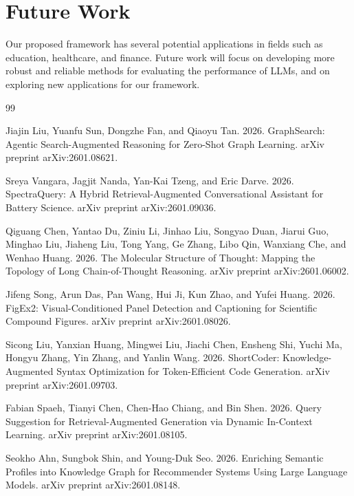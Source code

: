 \documentclass{article}
\begin{document}
\section{Future Work}

Our proposed framework has several potential applications in fields such as education, healthcare, and finance. Future work will focus on developing more robust and reliable methods for evaluating the performance of LLMs, and on exploring new applications for our framework.

\begin{thebibliography}{99}

Jiajin Liu, Yuanfu Sun, Dongzhe Fan, and Qiaoyu Tan. 2026. GraphSearch: Agentic Search-Augmented Reasoning for Zero-Shot Graph Learning. arXiv preprint arXiv:2601.08621.

Sreya Vangara, Jagjit Nanda, Yan-Kai Tzeng, and Eric Darve. 2026. SpectraQuery: A Hybrid Retrieval-Augmented Conversational Assistant for Battery Science. arXiv preprint arXiv:2601.09036.

Qiguang Chen, Yantao Du, Ziniu Li, Jinhao Liu, Songyao Duan, Jiarui Guo, Minghao Liu, Jiaheng Liu, Tong Yang, Ge Zhang, Libo Qin, Wanxiang Che, and Wenhao Huang. 2026. The Molecular Structure of Thought: Mapping the Topology of Long Chain-of-Thought Reasoning. arXiv preprint arXiv:2601.06002.

Jifeng Song, Arun Das, Pan Wang, Hui Ji, Kun Zhao, and Yufei Huang. 2026. FigEx2: Visual-Conditioned Panel Detection and Captioning for Scientific Compound Figures. arXiv preprint arXiv:2601.08026.

Sicong Liu, Yanxian Huang, Mingwei Liu, Jiachi Chen, Ensheng Shi, Yuchi Ma, Hongyu Zhang, Yin Zhang, and Yanlin Wang. 2026. ShortCoder: Knowledge-Augmented Syntax Optimization for Token-Efficient Code Generation. arXiv preprint arXiv:2601.09703.

Fabian Spaeh, Tianyi Chen, Chen-Hao Chiang, and Bin Shen. 2026. Query Suggestion for Retrieval-Augmented Generation via Dynamic In-Context Learning. arXiv preprint arXiv:2601.08105.

Seokho Ahn, Sungbok Shin, and Young-Duk Seo. 2026. Enriching Semantic Profiles into Knowledge Graph for Recommender Systems Using Large Language Models. arXiv preprint arXiv:2601.08148.


\end{thebibliography}
\end{document}
